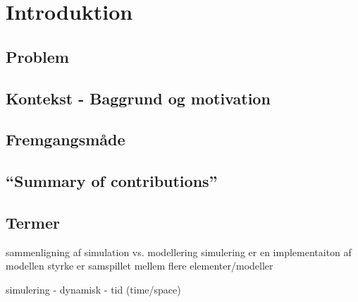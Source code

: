 \chapter{Introduktion}
  \section{Problem}	 
  \section{Kontekst - Baggrund og motivation}
  \section{Fremgangsmåde}
  \section{``Summary of contributions''}
  \section{Termer}


sammenligning af simulation vs. modellering
  simulering er en implementaiton af modellen
  styrke er samspillet mellem flere elementer/modeller


simulering - dynamisk - tid (time/space)

